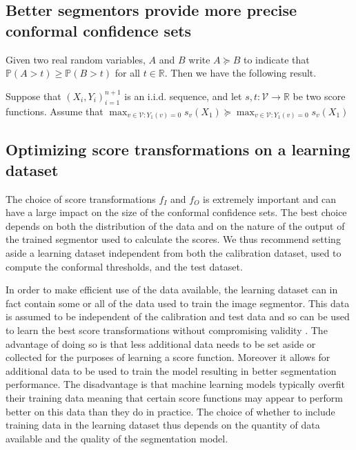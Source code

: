 \subsection{Better segmentors provide more precise conformal confidence sets}
Given two real random variables, $A$ and $B$ write $ A \succeq B$ to indicate that $\mathbb{P}\left( A > t \right) \geq \mathbb{P}\left( B > t \right)$ for all $t \in \mathbb{R}$. Then we have the following result. 
\begin{theorem}
	Suppose that $(X_i, Y_i)_{i = 1}^{n+1}$ is an i.i.d. sequence, and let $s, t: \mathcal{V} \rightarrow \mathbb{R}$ be two score functions. Assume that 
	$\max_{v \in \mathcal{V}: Y_1(v) = 0} s_v(X_{1}) \succeq \max_{v \in \mathcal{V}: Y_1(v) = 0} s_v(X_{1}) $
\end{theorem}

\subsection{Optimizing score transformations on  a learning dataset}
The choice of score transformations $f_I$ and $f_O$ is extremely important and can have a large impact on the size of the conformal confidence sets. The best choice depends on both the distribution of the data and on the nature of the output of the trained segmentor used to calculate the scores. We thus recommend setting aside a learning dataset independent from both the calibration dataset, used to compute the conformal thresholds, and the test dataset. 

In order to make efficient use of the data available, the learning dataset can in fact contain some or all of the data used to train the image segmentor. This data is assumed to be independent of the calibration and test data and so can be used to learn the best score transformations without compromising validity . The advantage of doing so is that less additional data needs to be set aside or collected for the purposes of learning a score function. Moreover it allows for additional data to be used to train the model resulting in better segmentation performance. The disadvantage is that machine learning models typically overfit their training data meaning that certain score functions may appear to perform better on this data than they do in practice. The choice of whether to include training data in the learning dataset thus depends on the quantity of data available and the quality of the segmentation model.


